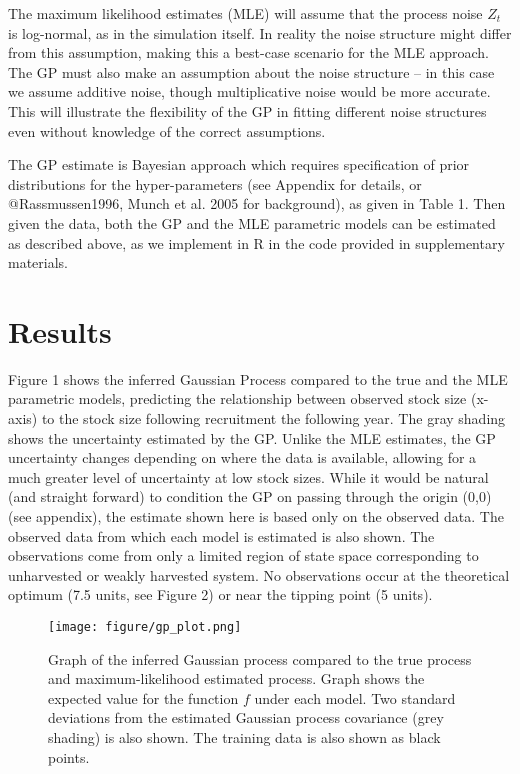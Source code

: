 \documentclass[author-year, review]{elsarticle} %
\makeatletter
\def\maxwidth{\ifdim\Gin@nat@width>\linewidth\linewidth
\else\Gin@nat@width\fi}
\let\Oldincludegraphics\includegraphics
\renewcommand{\includegraphics}[1]{\Oldincludegraphics[width=\maxwidth]{#1}}
\makeatother
\begin{document}
The maximum likelihood estimates (MLE) will assume that the process
noise $Z_t$ is log-normal, as in the simulation itself. In reality the
noise structure might differ from this assumption, making this a
best-case scenario for the MLE approach.\\The GP must also make an
assumption about the noise structure -- in this case we assume additive
noise, though multiplicative noise would be more accurate. This will
illustrate the flexibility of the GP in fitting different noise
structures even without knowledge of the correct assumptions.

The GP estimate is Bayesian approach which requires specification of
prior distributions for the hyper-parameters (see Appendix for details,
or @Rassmussen1996, Munch et al. 2005 for background), as given in Table
1. Then given the data, both the GP and the MLE parametric models can be
estimated as described above, as we implement in R in the code provided
in supplementary materials.

\section{Results}

Figure 1 shows the inferred Gaussian Process compared to the true and
the MLE parametric models, predicting the relationship between observed
stock size (x-axis) to the stock size following recruitment the
following year. The gray shading shows the uncertainty estimated by the
GP. Unlike the MLE estimates, the GP uncertainty changes depending on
where the data is available, allowing for a much greater level of
uncertainty at low stock sizes. While it would be natural (and straight
forward) to condition the GP on passing through the origin (0,0) (see
appendix), the estimate shown here is based only on the observed data.
The observed data from which each model is estimated is also shown. The
observations come from only a limited region of state space
corresponding to unharvested or weakly harvested system. No observations
occur at the theoretical optimum (7.5 units, see Figure 2) or near the
tipping point (5 units).

\begin{figure}[htbp]
\centering
\texttt{[image: figure/gp\_plot.png]}
\caption{Graph of the inferred Gaussian process compared to the true
process and maximum-likelihood estimated process. Graph shows the
expected value for the function $f$ under each model. Two standard
deviations from the estimated Gaussian process covariance (grey shading)
is also shown. The training data is also shown as black points.}
\end{figure}
\end{document}
